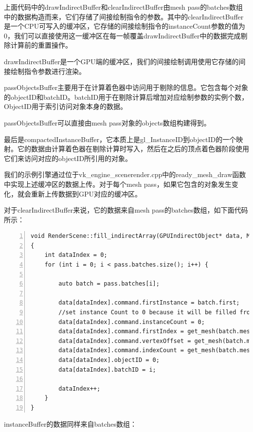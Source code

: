 \documentclass{ctexart}
\begin{document}
上面代码中的drawIndirectBuffer和clearIndirectBuffer由mesh pass的batches数组中的数据构造而来，它们存储了间接绘制指令的参数。其中的clearIndirectBuffer是一个CPU可写入的缓冲区，它存储的间接绘制指令的instanceCount参数的值为0，我们可以直接使用这一缓冲区在每一帧覆盖drawIndirectBuffer中的数据完成剔除计算前的重置操作。

drawIndirectBuffer是一个GPU端的缓冲区，我们的间接绘制调用使用它存储的间接绘制指令参数进行渲染。

passObjectsBuffer主要用于在计算着色器中访问用于剔除的信息。它包含每个对象的objectID和batchID。batchID用于在剔除计算后增加对应绘制参数的实例个数，ObjectID用于索引访问对象本身的数据。

passObjectsBuffer可以直接由mesh pass对象的objects数组构建得到。

最后是compactedInstanceBuffer，它本质上是gl\_InstanceID到objectID的一个映射。它的数据由计算着色器在剔除计算时写入，然后在之后的顶点着色器阶段使用它们来访问对应的objectID所引用的对象。

我们的示例引擎通过位于vk\_engine\_scenerender.cpp中的ready\_mesh\_draw函数中实现上述缓冲区的数据上传。对于每个mesh pass，如果它包含的对象发生变化，就会重新上传数据到GPU对应的缓冲区。

对于clearIndirectBuffer来说，它的数据来自mesh pass的batches数组，如下面代码所示：

\begin{lstlisting}[language={[ANSI]C},keywordstyle=\color{blue!70},commentstyle=\color{red!50!green!50!blue!50},frame=shadowbox, rulesepcolor=\color{red!20!green!20!blue!20},basicstyle=\small,numbers=left, numberstyle=\tiny,breaklines=true]
void RenderScene::fill_indirectArray(GPUIndirectObject* data, MeshPass& dpass)
{
	int dataIndex = 0;
	for (int i = 0; i < pass.batches.size(); i++) {

		auto batch = pass.batches[i];

		data[dataIndex].command.firstInstance = batch.first;
		//set instance Count to 0 because it will be filled from the compute shader
		data[dataIndex].command.instanceCount = 0;
		data[dataIndex].command.firstIndex = get_mesh(batch.meshID)->firstIndex;
		data[dataIndex].command.vertexOffset = get_mesh(batch.meshID)->firstVertex;
		data[dataIndex].command.indexCount = get_mesh(batch.meshID)->indexCount;
		data[dataIndex].objectID = 0;
		data[dataIndex].batchID = i;

		dataIndex++;
	}
}
\end{lstlisting}

instanceBuffer的数据同样来自batches数组：
\end{document}
